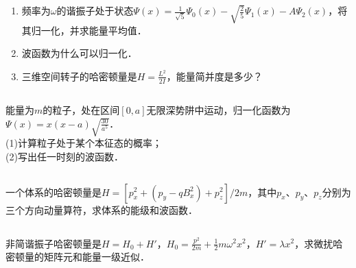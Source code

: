 
\subsection{ }
\begin{enumerate}
\item 频率为$\omega$的谐振子处于状态$\varPsi (x)=\frac{1}{\sqrt{5}}\varPsi_{0} (x)-\sqrt{\frac{2}{5}}\varPsi_{1} (x)-A\varPsi_2 (x)$，将其归一化，并求能量平均值．
\item 波函数为什么可以归一化．
\item 三维空间转子的哈密顿量是$H=\frac{L^{2}}{2I}$，能量简并度是多少？
\end{enumerate}
\subsection{ }
能量为$m$的粒子，处在区间$[0,a]$无限深势阱中运动，归一化函数为$\varPsi (x)=x(x-a)\sqrt{\frac{30}{a^{5}}}$．\\
(1)计算粒子处于某个本征态的概率；\\
(2)写出任一时刻的波函数．
\subsection{ }
一个体系的哈密顿量是$H=[p^{2}_{x}+(p_{y}-qB_{x}^{2})+p^{2}_{z}]/2m$，其中$p_{x}$、$p_{y}$、$p_{z}$分别为三个方向动量算符，求体系的能级和波函数．
\subsection{ }
非简谐振子哈密顿量是$H=H_{0}+H'$，$H_{0}=\frac{p^{2}}{2m}+\frac{1}{2}m\omega^{2}x^{2}$，$H'=\lambda x^{2}$，求微扰哈密顿量的矩阵元和能量一级近似．
\subsection{ }
